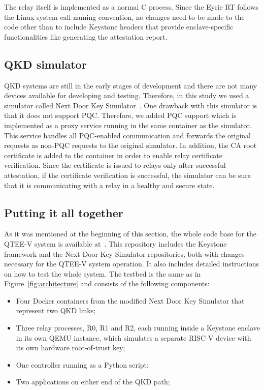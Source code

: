 \documentclass[futureinternet,article,submit,moreauthors]{Definitions/mdpi}
\begin{document}
The relay itself is implemented as a normal C process. Since the Eyrie RT follows the Linux system call naming convention, no changes need to be made to the code other than to include Keystone headers that provide enclave-specific functionalities like generating the attestation report.

\subsection{QKD simulator}

QKD systems are still in the early stages of development and there are not many devices available for developing and testing. Therefore, in this study we used a simulator called Next Door Key Simulator~\cite{garkaklis_next_2023}. One drawback with this simulator is that it does not support PQC. Therefore, we added PQC support which is implemented as a proxy service running in the same container as the simulator. This service handles all PQC-enabled communication and forwards the original requests as non-PQC requests to the original simulator. In addition, the CA root certificate is added to the container in order to enable relay certificate verification. Since the certificate is issued to relays only after successful attestation, if the certificate verification is successful, the simulator can be sure that it is communicating with a relay in a healthy and secure state.

\subsection{Putting it all together}

As it was mentioned at the beginning of this section, the whole code base for the QTEE-V system is available at~\cite{dukic_qtee-v_2026}. This repository includes the Keystone framework and the Next Door Key Simulator repositories, both with changes necessary for the QTEE-V system operation. It also includes detailed instructions on how to test the whole system. The testbed is the same as in Figure~\ref{fig:architecture} and consists of the following components:

\begin{itemize}[leftmargin=*,labelsep=5.8mm]
\item Four Docker containers from the modified Next Door Key Simulator that represent two QKD links;
\item Three relay processes, R0, R1 and R2, each running inside a Keystone enclave in its own QEMU instance, which simulates a separate RISC-V device with its own hardware root-of-trust key;
\item One controller running as a Python script;
\item Two applications on either end of the QKD path;
\end{itemize}
\end{document}
